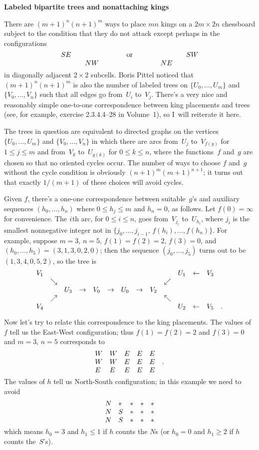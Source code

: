 \magnification{}
\baselineskip14pt
\def\adj{\mathrel-\joinrel\mathrel-}   %


\centerline{\bf Labeled bipartite trees and nonattaching kings}

\bigskip
There are $(m+1)^n(n+1)^m$ ways to place $mn$ kings on a $2m\times 2n$
chessboard subject to the condition that they do not attack except perhaps in
the configurations
$$\vcenter{\halign{$#$\hfil\qquad&$#$\hfil\qquad\qquad
&#\hfil\qquad\qquad&$#$\hfil\qquad&$#$\hfil\cr
SE&&or&&SW\cr
&NW&&NE\cr}}$$
in diagonally adjacent $2\times 2$ subcells. Boris Pittel noticed that
$(m+1)^n(n+1)^m$ is also the number of labeled trees on $\{U_0,\ldots,U_m\}$
and $\{V_0,\ldots,V_n\}$ such that all edges go from~$U_i$ to~$V_j$. There's a
very nice and reasonably simple one-to-one correspondence between king
placements and trees (see, for example, exercise 2.3.4.4--28 in Volume~1), so
I~will reiterate it here.

The trees in question are equivalent to directed graphs on 
the vertices $\{U_0,\ldots,
U_m\}$ and $\{V_0,\ldots, V_n\}$ in which there are arcs from~$U_j$
to~$V_{f(y)}$ for $1\leq j\leq m$ and from~$V_k$ to~$U_{g(k)}$ for $0\leq k\leq
n$, where the functions~$f$ and~$g$ are chosen so that no oriented cycles
occur. The number of ways to choose $f$ and~$g$ without the cycle condition is
obviously 
$(n+1)^m(m+1)^{n+1}$; it turns out that exactly $1/(m+1)$ of these choices will
avoid cycles.

Given $f$, there's a one-one correspondence between suitable~$g$'s and
auxiliary 
sequences $(h_0,\ldots,h_n)$ where $0\leq h_j\leq m$ and $h_n=0$, as follows.
Let $f(0)=\infty$ for convenience. The $i\/$th arc, for $0\leq i\leq n$, goes
from~$V_{j_i}$ to~$U_{h_i}$, where $j_i$ is the smallest nonnegative 
integer not in $\{j_0,\ldots,j_{i-1},\,f(h_i),\ldots,f(h_n)\}$. For example,
suppose $m=3$, $n=5$, $f(1)=f(2)=2$, $f(3)=0$, and
$(h_0,\ldots,h_5)=(3,1,3,0,2,0)$; then the sequence $(j_0,\ldots,j_5)$ turns out
to be $(1,3,4,0,5,2)$, so the tree is
$$\vcenter{\halign{$#$\hfil\quad
&$#$\hfil\quad
&$#$\hfil\quad
&$#$\hfil\quad
&$#$\hfil\quad
&$#$\hfil\quad
&$#$\hfil\quad
&$#$\hfil\quad
&$#$\hfil\quad
&$#$\hfil\quad
&$#$\hfil\quad
&$#$\hfil\quad
&$#$\hfil\quad
&#\cr
V_1&&&&&&&&&&U_1&\leftarrow&V_3\cr
&\searrow&&&&&&&&\swarrow\cr
&&U_3&\rightarrow&V_0&\rightarrow&U_0&\rightarrow&V_2\cr
&\nearrow&&&&&&&&\nwarrow\cr
V_4&&&&&&&&&&U_2&\leftarrow&V_5&.\cr}}$$

Now let's try to relate this correspondence to the king placements. The values
of~$f$ tell us the East-West configuration; thus $f(1)=f(2)=2$ and $f(3)=0$ and
$m=3$, $n=5$ corresponds to
$$\vcenter{\halign{$#$\hfil\quad
&$#$\hfil\quad
&$#$\hfil\quad
&$#$\hfil\quad
&$#$\hfil\quad
&#\hfil\cr
W&W&E&E&E\cr
W&W&E&E&E&.\cr
E&E&E&E&E\cr}}$$
The values of $h$ tell us North-South configuration; in this example we need to
avoid
$$\vcenter{\halign{$#$\hfil\quad
&$#$\hfil\quad
&$#$\hfil\quad
&$#$\hfil\quad
&$#$\hfil\cr
N&\ast&\ast&\ast&\ast\cr
N&S&\ast&\ast&\ast\cr
N&S&\ast&\ast&\ast\cr}}$$
which means $h_0=3$ and $h_1\leq 1$ if $h$ counts the $N$s (or $h_0=0$ and
$h_1\geq 2$ if $h$ counts the~$S$'s).

